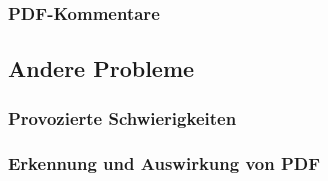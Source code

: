 \subsubsection{PDF-Kommentare}%

\subsection{Andere Probleme}
\subsubsection{Provozierte Schwierigkeiten}
\subsubsection{Erkennung und Auswirkung von PDF}\label{subsubsec:problems:pdfinclusion}